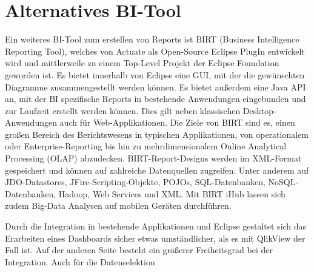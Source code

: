 \documentclass[10pt]{scrartcl}
\begin{document}
\section{Alternatives BI-Tool}

Ein weiteres BI-Tool zum erstellen von Reports ist BIRT (Business Intelligence Reporting Tool), welches von Actuate als Open-Source Eclipse PlugIn entwickelt wird und mittlerweile zu einem Top-Level Projekt der Eclipse Foundation geworden ist. Es bietet innerhalb von Eclipse eine GUI, mit der die gewünschten Diagramme zusammengestellt werden können. Es bietet außerdem eine Java API an, mit der BI spezifische Reports in bestehende Anwendungen eingebunden und zur Laufzeit erstellt werden können. Dies gilt neben klassischen Desktop-Anwendungen auch für Web-Applikationen.
Die Ziele von BIRT sind es, einen großen Bereich des Berichtswesens in typischen Applikationen, von operationalem oder Enterprise-Reporting bis hin zu mehrdimensionalem Online Analytical Processing (OLAP) abzudecken.
BIRT-Report-Designs werden im XML-Format gespeichert und können auf zahlreiche Datenquellen zugreifen. Unter anderem auf JDO-Datastores, JFire-Scripting-Objekte, POJOs, SQL-Datenbanken, NoSQL-Datenbanken, Hadoop, Web Services und XML. Mit BIRT iHub lassen sich zudem Big-Data Analysen auf mobilen Geräten durchführen.

Durch die Integration in bestehende Applikationen und Eclipse gestaltet sich das Erarbeiten eines Dashboards sicher etwas umständlicher, als es mit QlikView der Fall ist. Auf der anderen Seite besteht ein größerer Freiheitsgrad bei der Integration. Auch für die Datenselektion 
\end{document}
